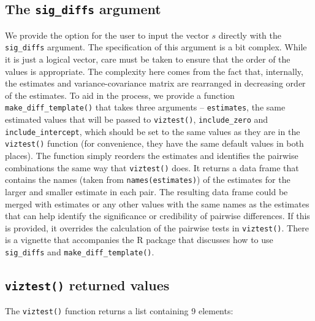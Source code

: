 \subsection{\texorpdfstring{The \texttt{sig\_diffs} argument}{The sig\_diffs argument}}\label{the-sig_diffs-argument}

We provide the option for the user to input the vector \(s\) directly with the \texttt{sig\_diffs} argument. The specification of this argument is a bit complex. While it is just a logical vector, care must be taken to ensure that the order of the values is appropriate. The complexity here comes from the fact that, internally, the estimates and variance-covariance matrix are rearranged in decreasing order of the estimates. To aid in the process, we provide a function \texttt{make\_diff\_template()} that takes three arguments -- \texttt{estimates}, the same estimated values that will be passed to \texttt{viztest()}, \texttt{include\_zero} and \texttt{include\_intercept}, which should be set to the same values as they are in the \texttt{viztest()} function (for convenience, they have the same default values in both places). The function simply reorders the estimates and identifies the pairwise combinations the same way that \texttt{viztest()} does. It returns a data frame that contains the names (taken from \texttt{names(estimates)}) of the estimates for the larger and smaller estimate in each pair. The resulting data frame could be merged with estimates or any other values with the same names as the estimates that can help identify the significance or credibility of pairwise differences. If this is provided, it overrides the calculation of the pairwise tests in \texttt{viztest()}. There is a vignette that accompanies the R package that discusses how to use \texttt{sig\_diffs} and \texttt{make\_diff\_template()}.

\subsection{\texorpdfstring{\texttt{viztest()} returned values}{viztest() returned values}}\label{viztest-returned-values}

The \texttt{viztest()} function returns a list containing 9 elements:

